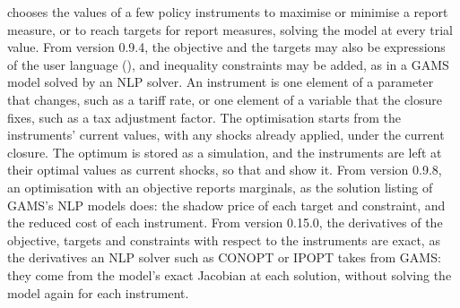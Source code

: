 

 chooses the values of a few policy instruments to maximise
or minimise a report measure, or to reach targets for report measures,
solving the model at every trial value. From version 0.9.4, the objective and
the targets may also be expressions of the user language
(), and inequality constraints may be added, as in a
GAMS model solved by an NLP solver. An instrument is one element of a
parameter that  changes, such as a tariff rate, or one
element of a variable that the closure fixes, such as a tax adjustment
factor. The optimisation starts from the instruments' current values, with
any shocks already applied, under the current closure. The optimum is stored
as a simulation, and the instruments are left at their optimal values as
current shocks, so that \mbox{} and \mbox{} show it.
From version 0.9.8, an optimisation with an objective reports marginals, as
the solution listing of GAMS's NLP models does: the shadow price of each
target and constraint, and the reduced cost of each instrument. From version
0.15.0, the derivatives of the objective, targets and constraints with
respect to the instruments are exact, as the derivatives an NLP solver such
as CONOPT or IPOPT takes from GAMS: they come from the model's exact Jacobian
at each solution, without solving the model again for each instrument.


